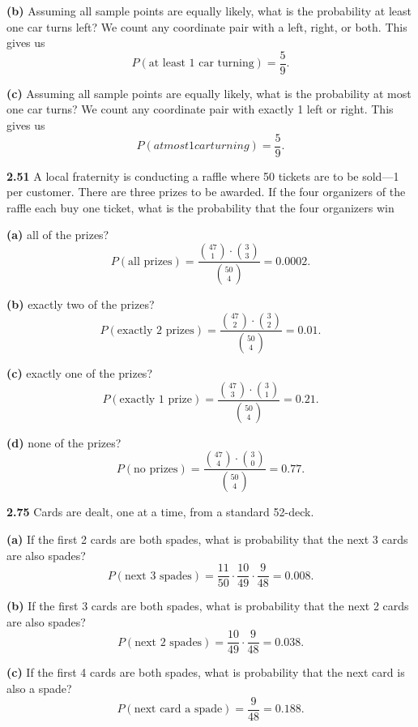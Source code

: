 \documentclass{exam}
\begin{document}
\begin{questions}
\textbf{(b) } Assuming all sample points are equally likely, what is the probability at least one car turns left?
\sol
We count any coordinate pair with a left, right, or both. This gives us
$$P(\text{at least 1 car turning}) = \frac{5}{9}.$$

\textbf{(c) } Assuming all sample points are equally likely, what is the probability at most one car turns?
\sol
We count any coordinate pair with exactly 1 left or right. This gives us
$$P(at most 1 car turning) = \frac{5}{9}.$$

\newpage



\textbf{2.51 } A local fraternity is conducting a raffle where 50 tickets are to be sold---1 per customer. There are three prizes to be awarded. If the four organizers of the raffle each buy one ticket, what is the probability that the four organizers win

\textbf{(a) } all of the prizes?
\sol
$$P(\text{all prizes}) = \frac{\binom{47}{1} \cdot \binom{3}{3}}{\binom{50}{4}} = 0.0002.$$

\textbf{(b) } exactly two of the prizes?
\sol
$$P(\text{exactly 2 prizes}) = \frac{\binom{47}{2} \cdot \binom{3}{2}}{\binom{50}{4}} = 0.01.$$

\textbf{(c) } exactly one of the prizes?
\sol
$$P(\text{exactly 1 prize}) = \frac{\binom{47}{3} \cdot \binom{3}{1}}{\binom{50}{4}} = 0.21.$$

\textbf{(d) } none of the prizes?
\sol
$$P(\text{no prizes}) = \frac{\binom{47}{4} \cdot \binom{3}{0}}{\binom{50}{4}} = 0.77.$$


\newpage


\textbf{2.75 } Cards are dealt, one at a time, from a standard 52-deck.

\textbf{(a) } If the first 2 cards are both spades, what is probability that the next 3 cards are also spades?
\sol
$$P(\text{next 3 spades}) = \frac{11}{50} \cdot \frac{10}{49} \cdot \frac{9}{48} = 0.008.$$


\textbf{(b) } If the first 3 cards are both spades, what is probability that the next 2 cards are also spades?
\sol
$$P(\text{next 2 spades}) = \frac{10}{49} \cdot \frac{9}{48} = 0.038.$$


\textbf{(c) } If the first 4 cards are both spades, what is probability that the next card is also a spade?
\sol
$$P(\text{next card a spade}) = \frac{9}{48} = 0.188.$$



\end{questions}
\end{document}
